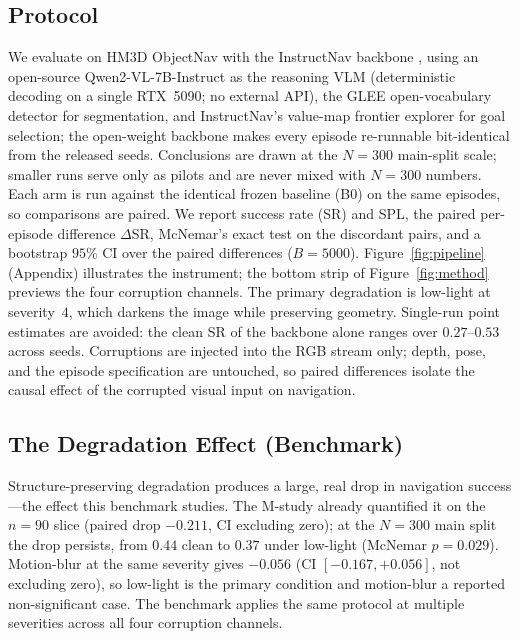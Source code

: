 \subsection{Protocol}
We evaluate on HM3D ObjectNav with the InstructNav backbone
\citep{long2024instructnav}, using an open-source Qwen2-VL-7B-Instruct
\citep{wang2024qwen2vl} as the reasoning VLM (deterministic decoding on a
single RTX~5090; no external API), the GLEE open-vocabulary detector
\citep{wu2024glee} for segmentation, and InstructNav's value-map frontier
explorer for goal selection; the open-weight backbone makes every episode
re-runnable bit-identical from the released seeds. Conclusions are drawn
at the $N{=}300$ main-split scale; smaller runs serve only as pilots and
are never mixed with $N{=}300$ numbers. Each arm is run against the identical frozen baseline
(B0) on the same episodes, so comparisons are paired. We report success rate
(SR) and SPL, the paired per-episode difference $\Delta$SR, McNemar's exact test
on the discordant pairs, and a bootstrap $95\%$ CI over the paired differences
($B{=}5000$). Figure~\ref{fig:pipeline} (Appendix) illustrates the
instrument; the bottom strip of Figure~\ref{fig:method} previews the
four corruption channels. The primary degradation is low-light at severity~$4$, which
darkens the image while preserving geometry. Single-run point estimates
are avoided: the clean SR of the backbone alone ranges over
$0.27$--$0.53$ across seeds. Corruptions are injected into the RGB
stream only; depth, pose, and the episode specification are untouched,
so paired differences isolate the causal effect of the corrupted
visual input on navigation.

\subsection{The Degradation Effect (Benchmark)}
Structure-preserving degradation produces a large, real drop in
navigation success---the effect this benchmark studies. The M-study already
quantified it on the $n{=}90$ slice (paired drop $-0.211$, CI excluding
zero); at the $N{=}300$ main split the drop persists, from $0.44$ clean to
$0.37$ under low-light (McNemar $p{=}0.029$). Motion-blur at the same
severity gives $-0.056$ (CI $[-0.167,+0.056]$, not excluding zero), so
low-light is the primary condition and motion-blur a reported
non-significant case. The benchmark applies the same protocol at
multiple severities across all four corruption channels.

